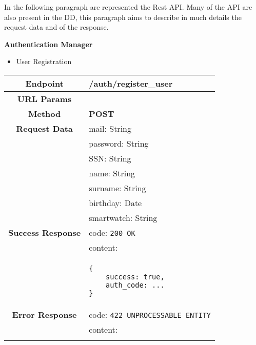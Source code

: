 In the following paragraph are represented the Rest API.
Many of the API are also present in the DD, this paragraph aims to describe in much details the request data and of the response.


    \textbf{Authentication Manager}
    \begin{itemize}
        \item User Registration
    \end{itemize}
    \begin{adjustwidth}{1cm}{}
        \begin{longtable}{|c|l|}
            \hline
            \textbf{Endpoint} & /auth/register\_user \\
            \hline
            \textbf{URL Params} &  \\
            \hline
            \textbf{Method} & \textbf{POST} \\
            \hline
            \textbf{Request Data} & mail: String \\
            &                 password: String \\
            &                 SSN: String \\
            &                 name: String \\
            &                 surname: String \\
            &                 birthday: Date \\
            &                 smartwatch: String \\
            \hline
            \textbf{Success Response} & code: \texttt{200 OK} \\
            &                           content: \\
            & \begin{minipage}[t]{0.5\textwidth}
                \begin{adjustwidth}{1.5cm}{}
                \begin{verbatim}
{
    success: true, 
    auth_code: ...
}
                \end{verbatim}
                \end{adjustwidth}
              \end{minipage} \\
              \hline
            \textbf{Error Response} & code: \texttt{422 UNPROCESSABLE ENTITY} \\
            &                         content: \\
            & \begin{minipage}[t]{0.7\textwidth}

\end{minipage}
\end{longtable}
\end{adjustwidth}
